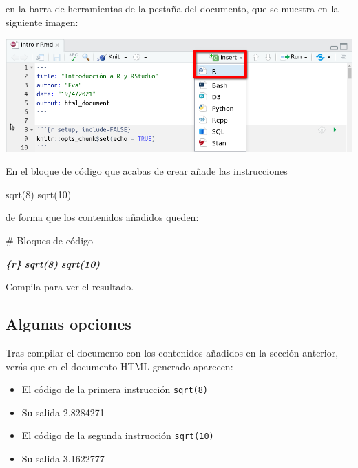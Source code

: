 \documentclass[
  degree=mecinf,
  title=normal,
  toc=normal,
  bib=normal]{mnye}
\providecommand{\tightlist}{%
  \setlength{\itemsep}{0pt}\setlength{\parskip}{0pt}}
\newenvironment{Shaded}{\begin{snugshade}}{\end{snugshade}}
\newcommand{\FunctionTok}[1]{\textcolor[rgb]{0.00,0.00,0.00}{#1}}
\newcommand{\InformationTok}[1]{\textcolor[rgb]{0.56,0.35,0.01}{\textbf{\textit{#1}}}}
\newcommand{\NormalTok}[1]{#1}
\begin{document}
en la barra de herramientas de la pestaña del documento, que se muestra en la siguiente imagen:

\begin{center}\includegraphics[width=1\linewidth]{images/insert-r} \end{center}

En el bloque de código que acabas de crear añade las instrucciones

\begin{Shaded}
\begin{Highlighting}[]
\NormalTok{sqrt(8)}
\NormalTok{sqrt(10)}
\end{Highlighting}
\end{Shaded}

de forma que los contenidos añadidos queden:

\begin{Shaded}
\begin{Highlighting}[]
\FunctionTok{\# Bloques de código}

\InformationTok{\textasciigrave{}\textasciigrave{}\textasciigrave{}\{r\}}
\InformationTok{sqrt(8)}
\InformationTok{sqrt(10)}
\InformationTok{\textasciigrave{}\textasciigrave{}\textasciigrave{}}
\end{Highlighting}
\end{Shaded}

Compila para ver el resultado.

\hypertarget{algunas-opciones}{%
\subsection{Algunas opciones}\label{algunas-opciones}}

Tras compilar el documento con los contenidos añadidos en la sección anterior, verás que en el documento HTML generado aparecen:

\begin{itemize}
\tightlist
\item
  El código de la primera instrucción \texttt{sqrt(8)}
\item
  Su salida 2.8284271
\item
  El código de la segunda instrucción \texttt{sqrt(10)}
\item
  Su salida 3.1622777
\end{itemize}
\end{document}
